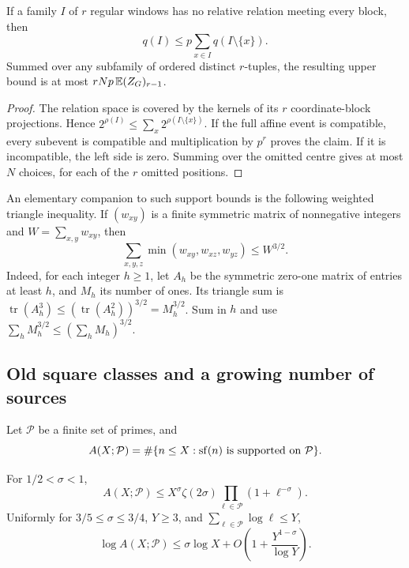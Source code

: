 \begin{lemma}
\label{p1:uniform:missing-block}
If a family \(I\) of \(r\) regular windows has no
relative relation meeting every block, then
\[
 q(I)\le p\sum_{x\in I}q(I\setminus\{x\}).
\]
Summed over any subfamily of ordered distinct
\(r\)-tuples, the resulting upper bound is at most
\(rNp\,\E(Z_G)_{r-1}\).
\end{lemma}

\begin{proof}
The relation space is covered by the kernels of
its \(r\) coordinate-block projections.
Hence \(2^{\rho(I)}\le\sum_x2^{\rho(I\setminus\{x\})}\).
If the full affine event is compatible, every
subevent is compatible and multiplication by
\(p^r\) proves the claim. If it is incompatible,
the left side is zero. Summing over the omitted
centre gives at most \(N\) choices, for each of
the \(r\) omitted positions.
\end{proof}

An elementary companion to such support bounds is the
following weighted triangle inequality. If
\((w_{xy})\) is a finite symmetric matrix of
nonnegative integers and \(W=\sum_{x,y}w_{xy}\), then
\[
 \sum_{x,y,z}\min(w_{xy},w_{xz},w_{yz})\le W^{3/2}.
\]
Indeed, for each integer \(h\ge1\), let \(A_h\) be the
symmetric zero-one matrix of entries at least \(h\),
and \(M_h\) its number of ones. Its triangle sum is
\(\operatorname{tr}(A_h^3)\le
(\operatorname{tr}(A_h^2))^{3/2}=M_h^{3/2}\).
Sum in \(h\) and use
\(\sum_hM_h^{3/2}\le(\sum_hM_h)^{3/2}\).

\subsection{Old square classes and a growing number of sources}

Let \(\mathcal P\) be a finite set of primes, and
\[
 A(X;\mathcal P)
   =\#\{n\le X:\sf(n)\text{ is supported on }\mathcal P\}.
\]

\begin{lemma}
\label{p1:uniform:prime-budget}
For \(1/2<\sigma<1\),
\[
 A(X;\mathcal P)\le
 X^\sigma\zeta(2\sigma)
                  \prod_{\ell\in\mathcal P}(1+\ell^{-\sigma}).
\]
Uniformly for \(3/5\le\sigma\le3/4\), \(Y\ge3\), and
\(\sum_{\ell\in\mathcal P}\log\ell\le Y\),
\[
 \log A(X;\mathcal P)
       \le \sigma\log X+
              O\left(1+\frac{Y^{1-\sigma}}{\log Y}\right).
\]
\end{lemma}

